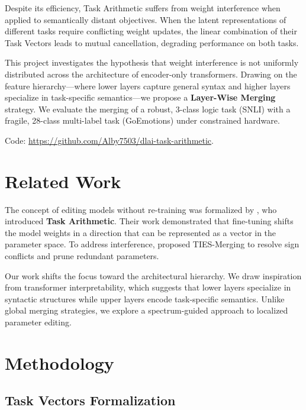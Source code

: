 \documentclass{article}
\begin{document}
Despite its efficiency, Task Arithmetic suffers from weight interference when applied to semantically distant objectives. When the latent representations of different tasks require conflicting weight updates, the linear combination of their Task Vectors leads to mutual cancellation, degrading performance on both tasks. 

This project investigates the hypothesis that weight interference is not uniformly distributed across the architecture of encoder-only transformers. Drawing on the feature hierarchy—where lower layers capture general syntax and higher layers specialize in task-specific semantics—we propose a \textbf{Layer-Wise Merging} strategy. We evaluate the merging of a robust, 3-class logic task (SNLI) with a fragile, 28-class multi-label task (GoEmotions) under constrained hardware. 

Code: \url{https://github.com/Alby7503/dlai-task-arithmetic}.

\section{Related Work}

The concept of editing models without re-training was formalized by \cite{ilharco2023editing}, who introduced \textbf{Task Arithmetic}. Their work demonstrated that fine-tuning shifts the model weights in a direction that can be represented as a vector in the parameter space. To address interference, \cite{yadav2023ties} proposed TIES-Merging to resolve sign conflicts and prune redundant parameters.

Our work shifts the focus toward the architectural hierarchy. We draw inspiration from transformer interpretability, which suggests that lower layers specialize in syntactic structures while upper layers encode task-specific semantics. Unlike global merging strategies, we explore a spectrum-guided approach to localized parameter editing.

\section{Methodology}

\subsection{Task Vectors Formalization}
\end{document}

